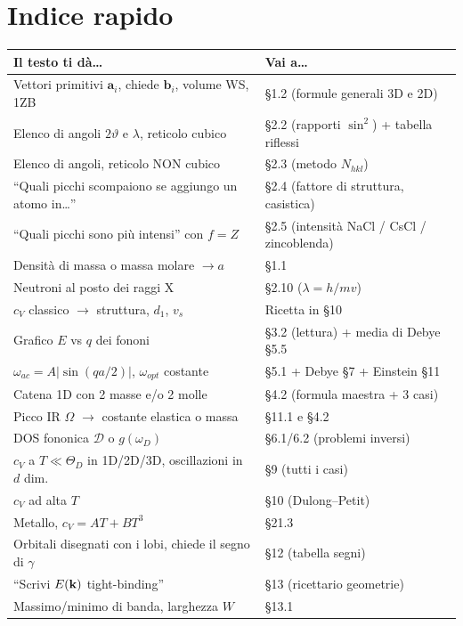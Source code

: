 \section{Indice rapido}
\begin{center}
\renewcommand{\arraystretch}{1.35}
{\small
\begin{tabular}{p{7.4cm} p{9.6cm}}
\toprule
\textbf{Il testo ti dà\dots} & \textbf{Vai a\dots} \\
\midrule
Vettori primitivi $\mathbf{a}_i$, chiede $\mathbf{b}_i$, volume WS, 1ZB & §1.2 (formule generali 3D e 2D)  \\
Elenco di angoli $2\vartheta$ e $\lambda$, reticolo cubico & §2.2 (rapporti $\sin^2$) + tabella riflessi  \\
Elenco di angoli, reticolo NON cubico & §2.3 (metodo $N_{hkl}$)  \\
``Quali picchi scompaiono se aggiungo un atomo in\dots'' & §2.4 (fattore di struttura, casistica)  \\
``Quali picchi sono più intensi'' con $f=Z$ & §2.5 (intensità NaCl / CsCl / zincoblenda)  \\
Densità di massa o massa molare $\to a$ & §1.1  \\
Neutroni al posto dei raggi X & §2.10 ($\lambda = h/mv$)  \\
$c_V$ classico $\to$ struttura, $d_1$, $v_s$ & Ricetta in §10  \\
Grafico $E$ vs $q$ dei fononi & §3.2 (lettura) + media di Debye §5.5  \\
$\omega_{ac}=A|\sin(qa/2)|$, $\omega_{opt}$ costante & §5.1 + Debye §7 + Einstein §11  \\
Catena 1D con 2 masse e/o 2 molle & §4.2 (formula maestra + 3 casi)  \\
Picco IR $\Omega$ $\to$ costante elastica o massa & §11.1 e §4.2  \\
DOS fononica $\mathcal{D}$ o $g(\omega_D)$ & §6.1/6.2 (problemi inversi)  \\
$c_V$ a $T\ll\Theta_D$ in 1D/2D/3D, oscillazioni in $d$ dim.\ & §9 (tutti i casi)  \\
$c_V$ ad alta $T$ & §10 (Dulong--Petit)  \\
Metallo, $c_V = AT+BT^3$ & §21.3  \\
\midrule
Orbitali disegnati con i lobi, chiede il segno di $\gamma$ & §12 (tabella segni)  \\
``Scrivi $E(\mathbf{k})$ tight-binding'' & §13 (ricettario geometrie)  \\
Massimo/minimo di banda, larghezza $W$ & §13.1  \\

\end{tabular}}
\end{center}
